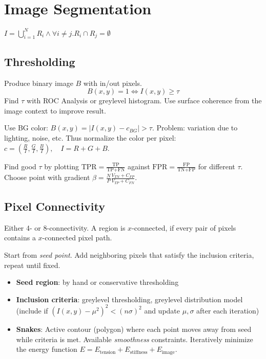 \section{Image Segmentation}
\begin{definition}
  \(I = \bigcup_{i=1}^N R_i \land \forall i \neq j. R_i \cap R_j = \emptyset\)
\end{definition}

\subsection{Thresholding}

\begin{definition}[Thresholding]
  Produce binary image \(B\) with in/out pixels.
  \[B(x, y) = 1  \iff I(x, y) \geq \tau\]
  Find \(\tau\) with ROC Analysis or greylevel histogram. Use surface coherence from the image context to improve result.
\end{definition}

\begin{definition}[Chromakeying]
  Use BG color: \(B(x, y) = |I(x, y) - c_{BG}| > \tau\).
  Problem: variation due to lighting, noise, etc.
  Thus normalize the color per pixel: \(c = (\frac{R}{I}, \frac{G}{I}, \frac{B}{I}), \quad I = R + G + B\).
\end{definition}

\begin{definition}
  Find good \(\tau\) by plotting \(\text{TPR} = \frac{\text{TP}}{\text{TP} + \text{FN}}\) against \(\text{FPR} = \frac{\text{FP}}{\text{TN} + \text{FP}}\) for different \(\tau\). 
  Choose point with gradient \(\beta = \frac{N}{P} \frac{V_{TN} + C_{FP}}{V_{TP} + C_{FN}}\).
\end{definition}

\subsection{Pixel Connectivity}
Either 4- or 8-connectivity. A region is \(x\)-connected, if every pair of pixels contains a \(x\)-connected pixel path.

\begin{definition}
  Start from \textit{seed point}. Add neighboring pixels that satisfy the inclusion criteria, repeat until fixed.

  \begin{itemize}
    \item \textbf{Seed region}: by hand or conservative thresholding
    \item \textbf{Inclusion criteria}: greylevel thresholding, greylevel distribution model (include if \((I(x, y) - \mu^2)^2 < (n \sigma)^2\) and update \(\mu, \sigma\) after each iteration)
    \item \textbf{Snakes}: Active contour (polygon) where each point moves away from seed while criteria is met.
    Available \textit{smoothness} constraints.
    Iteratively minimize the energy function \(E = E_{\text{tension}} + E_{\text{stiffness}} + E_{\text{image}}\).
  \end{itemize}
\end{definition}

